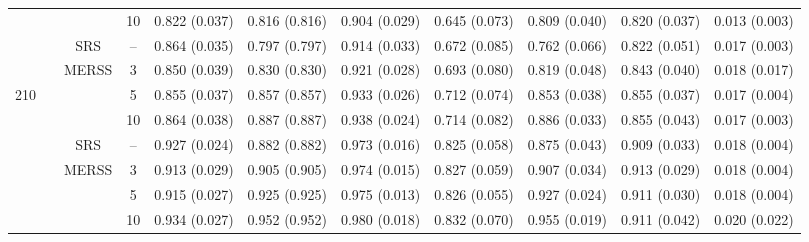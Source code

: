 \documentclass[twoside]{article}
\begin{document}
\begin{table}[!htb]
{\begin{tabular}{c c c c c c c c c c c}
    &                      &                                          &  10   &
 0.822 (0.037) & 0.816 (0.816) & 0.904 (0.029) & 0.645 (0.073) & 0.809 (0.040) & 0.820 (0.037)& 0.013 (0.003)  \\


    
 \cmidrule(lr){2-11}
  &\multirow{9}{*}{ }  & 
   \multirow{1}{*}{SRS} & -- 
 &0.864 (0.035) & 0.797 (0.797) & 0.914 (0.033) & 0.672 (0.085) & 0.762 (0.066) & 0.822 (0.051)& 0.017 (0.003)  \\
    
    \cmidrule(lr){3-11}
    &                      & \multirow{3}{*}{MERSS}   &  3   & 
    0.850 (0.039) & 0.830 (0.830) & 0.921 (0.028) & 0.693 (0.080) & 0.819 (0.048) & 0.843 (0.040)& 0.018 (0.017)  \\

  210 &          0.5            &                                          &  5    &
    0.855 (0.037) & 0.857 (0.857) & 0.933 (0.026) & 0.712 (0.074) & 0.853 (0.038) & 0.855 (0.037)& 0.017 (0.004)  \\

    &                      &                                          &  10   &
    0.864 (0.038) & 0.887 (0.887) & 0.938 (0.024) & 0.714 (0.082) & 0.886 (0.033) & 0.855 (0.043)& 0.017 (0.003)  \\

 

    \cmidrule(lr){2-11}
 &\multirow{9}{*}{ }  & 
    \multirow{1}{*}{SRS} & -- 
 &0.927 (0.024) & 0.882 (0.882) & 0.973 (0.016) & 0.825 (0.058) & 0.875 (0.043) & 0.909 (0.033)& 0.018 (0.004)  \\
    
    \cmidrule(lr){3-11}
    &                      & \multirow{3}{*}{MERSS}   &  3   & 
    0.913 (0.029) & 0.905 (0.905) & 0.974 (0.015) & 0.827 (0.059) & 0.907 (0.034) & 0.913 (0.029)& 0.018 (0.004)  \\

    &               0.7       &                                          &  5    &
    0.915 (0.027) & 0.925 (0.925) & 0.975 (0.013) & 0.826 (0.055) & 0.927 (0.024) & 0.911 (0.030)& 0.018 (0.004)  \\

    &                      &                                          &  10   &
   0.934 (0.027) & 0.952 (0.952) & 0.980 (0.018) & 0.832 (0.070) & 0.955 (0.019) & 0.911 (0.042)& 0.020 (0.022)  \\


\end{tabular}}
\end{table}
\end{document}
